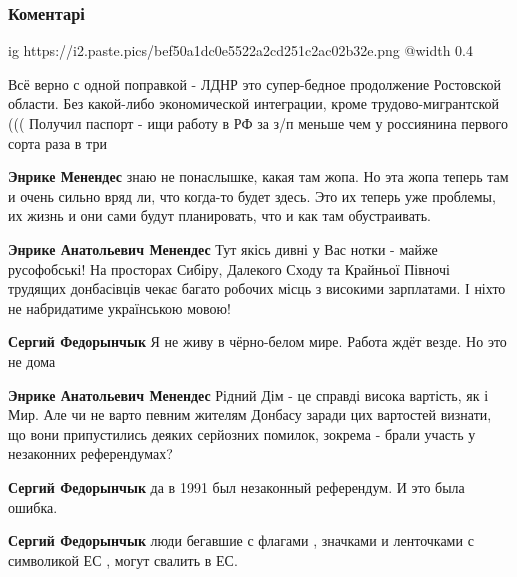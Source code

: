  
 
 
 
 
\subsubsection{Коментарі}

\begin{itemize} %

\ifcmt
  ig https://i2.paste.pics/bef50a1dc0e5522a2cd251c2ac02b32e.png
  @width 0.4
\fi


Всё верно с одной поправкой - ЛДНР это супер-бедное продолжение Ростовской
области. Без какой-либо экономической интеграции, кроме трудово-мигрантской (((
Получил паспорт - ищи работу в РФ за з/п меньше чем у россиянина первого сорта
раза в три

\begin{itemize} %
\textbf{Энрике Менендес} знаю не понаслышке, какая там жопа. Но эта жопа теперь там и очень сильно вряд ли, что когда-то будет здесь. Это их теперь уже проблемы, их жизнь и они сами будут планировать, что и как там обустраивать.

\textbf{Энрике Анатольевич Менендес} Тут якісь дивні у Вас нотки - майже русофобські! На просторах Сибіру, Далекого Сходу та Крайньої Півночі трудящих донбасівців чекає багато робочих місць з високими зарплатами. І ніхто не набридатиме українською мовою!

\textbf{Сергий Федорынчык} Я не живу в чёрно-белом мире. Работа ждёт везде. Но это не дома

\textbf{Энрике Анатольевич Менендес} Рідний Дім - це справді висока вартість, як і Мир. Але чи не варто певним жителям Донбасу заради цих вартостей визнати, що вони припустились деяких серйозних помилок, зокрема - брали участь у незаконних референдумах?

\textbf{Сергий Федорынчык} да в 1991 был незаконный референдум. И это была ошибка.

\textbf{Сергий Федорынчык} люди бегавшие с флагами , значками и ленточками с символикой ЕС , могут свалить в ЕС.


\end{itemize}
\end{itemize}
